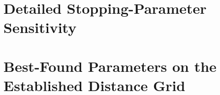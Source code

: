 \documentclass[10pt]{article}
\begin{document}
\setcounter{equation}{2}

\clearpage
\appendix
\section{Detailed Stopping-Parameter Sensitivity}

\section{Best-Found Parameters on the Established Distance Grid}

\end{document}
